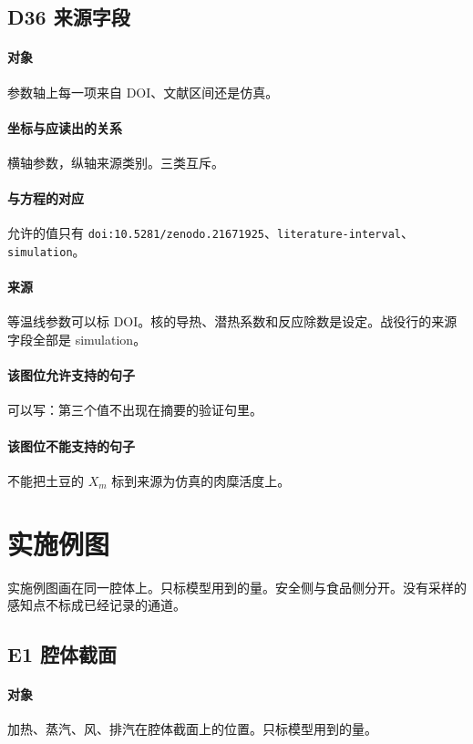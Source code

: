 \subsection{D36 来源字段}
\paragraph{对象}
参数轴上每一项来自 DOI、文献区间还是仿真。

\paragraph{坐标与应读出的关系}
横轴参数，纵轴来源类别。三类互斥。

\paragraph{与方程的对应}
允许的值只有 \texttt{doi:10.5281/zenodo.21671925}、\texttt{literature-interval}、\texttt{simulation}。

\paragraph{来源}
等温线参数可以标 DOI。核的导热、潜热系数和反应除数是设定。战役行的来源字段全部是 simulation。

\paragraph{该图位允许支持的句子}
可以写：第三个值不出现在摘要的验证句里。

\paragraph{该图位不能支持的句子}
不能把土豆的 $X_m$ 标到来源为仿真的肉糜活度上。

\section{实施例图}

实施例图画在同一腔体上。只标模型用到的量。安全侧与食品侧分开。没有采样的感知点不标成已经记录的通道。

\subsection{E1 腔体截面}
\paragraph{对象}
加热、蒸汽、风、排汽在腔体截面上的位置。只标模型用到的量。

